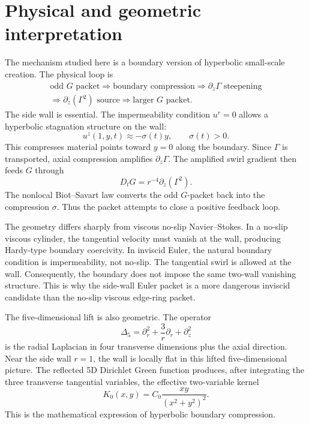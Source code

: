 \documentclass[11pt]{amsart}
\begin{document}
\section{Physical and geometric interpretation}

The mechanism studied here is a boundary version of hyperbolic small-scale creation.  The physical loop is
\begin{equation}\label{eq:physical_loop}
\boxed{\begin{gathered}
\text{odd }G\text{ packet}\Rightarrow\text{boundary compression}
\Rightarrow\partial_z\Gamma\text{ steepening}\\
\Rightarrow\partial_z(\Gamma^2)\text{ source}
\Rightarrow\text{larger }G\text{ packet}.
\end{gathered}}
\end{equation}
The side wall is essential.  The impermeability condition \(u^r=0\) allows a hyperbolic stagnation structure on the wall:
\begin{equation}\label{eq:hyperbolic_velocity}
u^z(1,y,t)\approx -\sigma(t)y,
\qquad
\sigma(t)>0.
\end{equation}
This compresses material points toward \(y=0\) along the boundary.  Since \(\Gamma\) is transported, axial compression amplifies \(\partial_z\Gamma\).  The amplified swirl gradient then feeds \(G\) through
\[
D_tG=r^{-4}\partial_z(\Gamma^2).
\]
The nonlocal Biot--Savart law converts the odd \(G\)-packet back into the compression \(\sigma\).  Thus the packet attempts to close a positive feedback loop.

The geometry differs sharply from viscous no-slip Navier--Stokes.  In a no-slip viscous cylinder, the tangential velocity must vanish at the wall, producing Hardy-type boundary coercivity.  In inviscid Euler, the natural boundary condition is impermeability, not no-slip.  The tangential swirl is allowed at the wall.  Consequently, the boundary does not impose the same two-wall vanishing structure.  This is why the side-wall Euler packet is a more dangerous inviscid candidate than the no-slip viscous edge-ring packet.

The five-dimensional lift is also geometric.  The operator
\[
\Delta_5=\partial_r^2+\frac3r\partial_r+\partial_z^2
\]
is the radial Laplacian in four transverse dimensions plus the axial direction.  Near the side wall \(r=1\), the wall is locally flat in this lifted five-dimensional picture.  The reflected 5D Dirichlet Green function produces, after integrating the three transverse tangential variables, the effective two-variable kernel
\[
K_0(x,y)=C_0\frac{xy}{(x^2+y^2)^2}.
\]
This is the mathematical expression of hyperbolic boundary compression.
\end{document}
